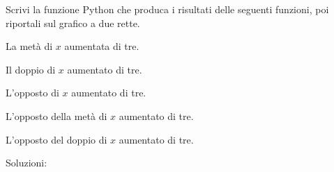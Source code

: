 \begin{esercizio}\label{ese:03.1}
Scrivi la funzione Python che produca i risultati delle seguenti funzioni, 
poi riportali sul grafico a due rette.
 \begin{enumeratea}
  \item La metà di \(x\) aumentata di tre.
  \item Il doppio di \(x\) aumentato di tre.
  \item L'opposto di \(x\) aumentato di tre.
  \item L'opposto della metà di \(x\) aumentato di tre.
  \item L'opposto del doppio di \(x\) aumentato di tre.
 \end{enumeratea}

Soluzioni:

\begin{minipage}{.39\textwidth}

\end{minipage}
\begin{minipage}{.59\textwidth}
\end{minipage}

\begin{minipage}{.39\textwidth}

\end{minipage}
\begin{minipage}{.59\textwidth}
\end{minipage}

\begin{minipage}{.39\textwidth}

\end{minipage}
\begin{minipage}{.59\textwidth}
\end{minipage}

\begin{minipage}{.39\textwidth}

\end{minipage}
\begin{minipage}{.59\textwidth}
\end{minipage}

\begin{minipage}{.39\textwidth}

\end{minipage}
\begin{minipage}{.59\textwidth}
\end{minipage}

\end{esercizio}

